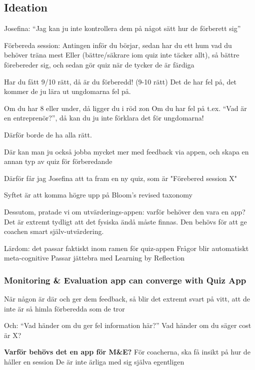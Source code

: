 \subsection*{Ideation}

Josefina: “Jag kan ju inte kontrollera dem på något sätt hur de förberett sig”

Förbereda session:
Antingen inför du börjar, sedan har du ett hum vad du behöver träna mest
Eller (bättre/säkrare iom quiz inte täcker allt), så bättre förebereder sig, och sedan gör quiz när de tycker de är färdiga

Har du fått 9/10 rätt, då är du förberedd! (9-10 rätt) 
Det de har fel på, det kommer de ju lära ut ungdomarna fel på.

Om du har 8 eller under, då ligger du i röd zon
Om du har fel på t.ex. “Vad är en entreprenör?”, då kan du ju inte förklara det för ungdomarna!

Därför borde de ha alla rätt.

Där kan man ju också jobba mycket mer med feedback via appen, och skapa en annan typ av quiz för förberedande

Därför får jag Josefina att ta fram en ny quiz, som är "Förebered session X"


Syftet är att komma högre upp på Bloom's revised taxonomy

Dessutom, pratade vi om utvärderings-appen: varför behöver den vara en app? Det är extremt tydligt att det fysiska ändå måste finnas. Den behövs för att ge coachen smart själv-utvärdering.

Lärdom: det passar faktiskt inom ramen för quiz-appen
Frågor blir automatiskt meta-cognitive
Passar jättebra med Learning by Reflection

\subsubsection{Monitoring \& Evaluation app can converge with Quiz App}
När någon är där och ger dem feedback, så blir det extremt svart på vitt, att de inte är så himla förberedda som de tror

Och: “Vad händer om du ger fel information här?” Vad händer om du säger cost är X?

\textbf{Varför behövs det en app för M\&E?}
För coacherna, ska få insikt på hur de håller en session
De är inte ärliga med sig själva egentligen

